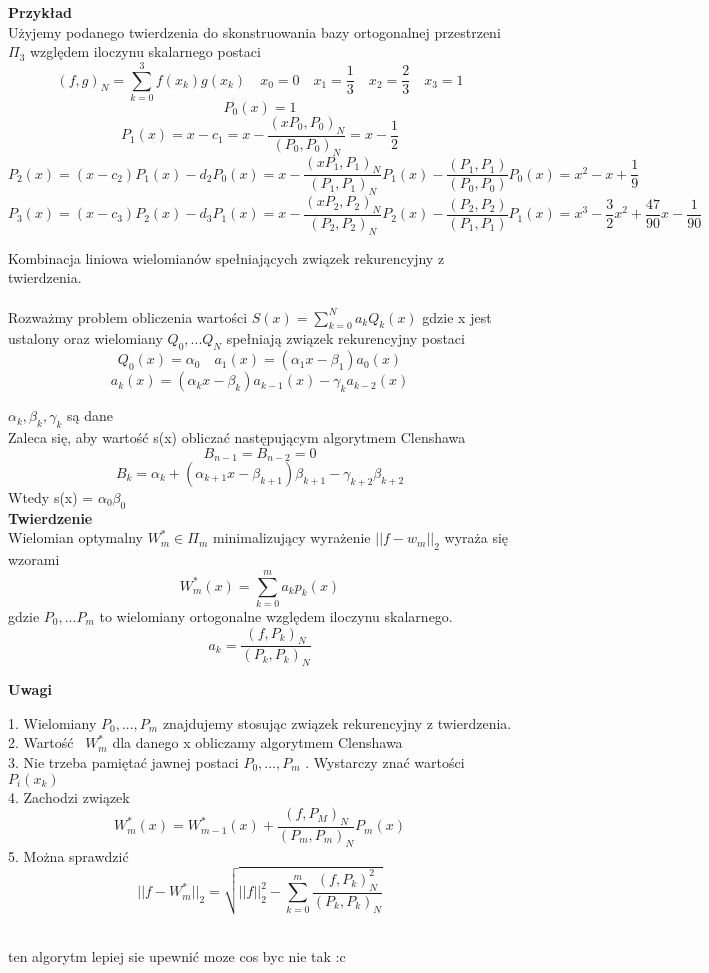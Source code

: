 \documentclass[polish]{kbk}
\begin{document}
\textbf{Przykład} \\
Użyjemy podanego twierdzenia do skonstruowania bazy ortogonalnej przestrzeni \( \Pi_3 \) względem iloczynu skalarnego postaci
$$ (f,g)_N = \sum_{k=0}^3 f(x_k)g(x_k) \quad x_0 = 0 \quad x_1 = \frac{1}{3} \quad x_2 = \frac{2}{3} \quad x_3 = 1 $$
$$ P_0(x) = 1 $$
$$ P_1(x) = x - c_1 = x - \frac{ (xP_0, P_0)_N } { (P_0, P_0 )_N} = x - \frac{1}{2} $$
$$ P_2(x) = (x-c_2)P_1(x) - d_2P_0(x) = x - \frac{ (xP_1, P_1)_N } { (P_1, P_1 )_N} P_1(x) - \frac{ (P_1, P_1 ) } { (P_0, P_0 ) } P_0(x) = x^2 - x + \frac{1}{9}$$ 
$$ P_3(x) = (x-c_3)P_2(x) - d_3P_1(x) = x - \frac{ (xP_2, P_2)_N } { (P_2, P_2 )_N} P_2(x) - \frac{ (P_2, P_2 ) } { (P_1, P_1 ) } P_1(x) = x^3 - \frac{3}{2}x^2 + \frac{47}{90}x - \frac{1}{90}$$

Kombinacja liniowa wielomianów spełniających związek rekurencyjny z twierdzenia.
\\\\
Rozważmy problem obliczenia wartości \( S(x) = \sum_{k=0}^N a_k Q_k(x) \) gdzie x jest ustalony oraz wielomiany \(Q_0, ... Q_N\) spełniają związek rekurencyjny postaci 
$$ Q_0(x) = \alpha_0 \quad a_1(x) = (\alpha_1x - \beta_1)a_0(x) $$
$$ a_k(x) = (\alpha_kx-\beta_k) a_{k-1}(x) - \gamma_k a_{k-2}(x) $$

\( \alpha_k, \beta_k, \gamma_k \) są dane\\


Zaleca się, aby wartość s(x) obliczać następującym algorytmem Clenshawa ~\cite{znaczek}
$$B_{n-1} = B_{n-2} = 0 $$
$$ B_k = \alpha_k + (\alpha_{k+1}x - \beta_{k+1})\beta_{k+1} - \gamma_{k+2}\beta_{k+2} $$
Wtedy s(x) = \( \alpha_0 \beta_0 \) \\

\textbf{Twierdzenie} \\
Wielomian optymalny \( W^{*}_m \in \Pi_m \) minimalizujący wyrażenie \( || f - w_m ||_2 \) wyraża się wzorami 
$$ W^{*}_m(x) = \sum_{k=0}^m a_kp_k(x) $$ gdzie
\( P_0, ... P_m \) to wielomiany ortogonalne względem iloczynu skalarnego.
$$ a_k = \frac { (f, P_k)_N }{ (P_k, P_k)_N } $$

\begin{center}
\textbf{Uwagi}
\end{center}

1. Wielomiany \(P_0, ... , P_m\) znajdujemy stosując związek rekurencyjny z twierdzenia.\\
2. Wartość  \( W^{*}_m \) dla danego x obliczamy algorytmem Clenshawa \\
3. Nie trzeba pamiętać jawnej postaci \(P_0, ... , P_m\)  . Wystarczy znać wartości \(P_i(x_k)\)  \\
4. Zachodzi związek
$$ W^{*}_m (x) = W^{*}_{m-1}(x) + \frac{ (f, P_M)_N} {(P_m, P_m)_N} P_m(x) $$
5. Można sprawdzić
$$ || f - W^{*}_m||_2 = \sqrt{ ||f||^2_2 - \sum_{k=0}^m \frac { (f, P_k)^{2}_N} { (P_k, P_k)_N } } $$ ~\cite{znaczek2}

\begin{thebibliography}{99}
 ten algorytm lepiej sie upewnić
 moze cos byc nie tak :c
\end{thebibliography}
\end{document}
